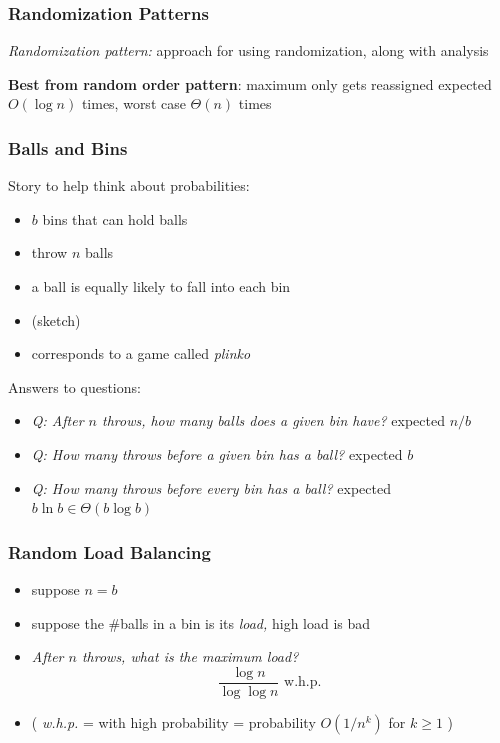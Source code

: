 \documentclass[10pt]{beamer}
\begin{document}
\begin{frame} \frametitle{Randomization Patterns}
\emph{Randomization pattern:} approach for using randomization, along with
analysis
\vspace{1cm}

\textbf{Best from random order pattern}: maximum only gets reassigned expected $O(\log n)$ times,
worst case $\Theta(n)$ times

\end{frame}

\begin{frame} \frametitle{Balls and Bins}
Story to help think about probabilities:
\begin{itemize}
  \item $b$ bins that can hold balls
  \item throw $n$ balls
  \item a ball is equally likely to fall into each bin
  \item (sketch)
  \item corresponds to a game called \emph{plinko}
\end{itemize}

Answers to questions:
\begin{itemize}
  \item \emph{Q: After $n$ throws, how many balls does a given bin have?} expected $n/b$
  \item \emph{Q: How many throws before a given bin has a ball?} expected $b$
  \item \emph{Q: How many throws before every bin has a ball?} expected $b \ln b \in \Theta(b \log b)$
\end{itemize}
\end{frame}

\begin{frame} \frametitle{Random Load Balancing}
\begin{itemize}
  \item suppose $n=b$
  \item suppose the \#balls in a bin is its \emph{load,} high load is bad
  \item \emph{After $n$ throws, what is the maximum load?}
    \[ \frac{\log n}{\log \log n} \text{ w.h.p. } \]
  \item ( \emph{w.h.p.} = with high probability = probability $O(1/n^k)$ for $k \geq 1$ )
\end{itemize}
\end{frame}
\end{document}

